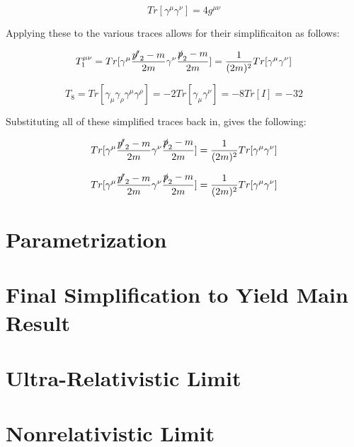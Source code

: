 \documentclass[a4]{article}
\begin{document}
    \begin{equation}
        Tr [\gamma^\mu \gamma^\nu] = 4 g^{\mu \nu}
    \end{equation}

    Applying these to the various traces allows for their simplificaiton as follows:

    \begin{equation}
        T_1^{\mu \nu} = Tr [\gamma^\mu \frac{\slashed{p'}_2 - m}{2m} \gamma^\nu \frac{\slashed{p}_2 - m}{2 m}] = \frac{1}{(2m)^2} Tr[\gamma^\mu \gamma^\nu]
    \end{equation}


    \begin{equation}
        T_8 = Tr [\gamma_\mu \gamma_\rho \gamma^\mu \gamma^\rho] = - 2 Tr [\gamma_\mu \gamma^\nu] = - 8 Tr [I] = -32
    \end{equation}

    Substituting all of these simplified traces back in, gives the following:

    \begin{equation}
        Tr [\gamma^\mu \frac{\slashed{p'}_2 - m}{2m} \gamma^\nu \frac{\slashed{p}_2 - m}{2 m}] = \frac{1}{(2m)^2} Tr[\gamma^\mu \gamma^\nu]
    \end{equation}

    \begin{equation}
        Tr [\gamma^\mu \frac{\slashed{p'}_2 - m}{2m} \gamma^\nu \frac{\slashed{p}_2 - m}{2 m}] = \frac{1}{(2m)^2} Tr[\gamma^\mu \gamma^\nu]
    \end{equation}

    \section*{Parametrization}

    \section*{Final Simplification to Yield Main Result}

    \section*{Ultra-Relativistic Limit}

    \section*{Nonrelativistic Limit}
\end{document}
